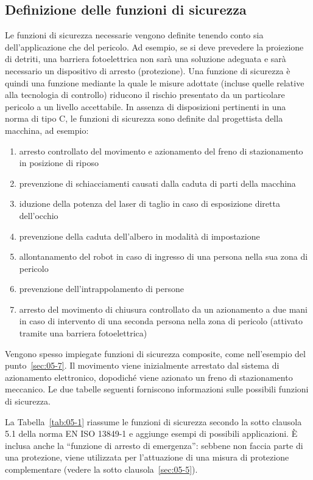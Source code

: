\subsection{Definizione delle funzioni di sicurezza}
\label{subsec:05-3-1}
Le funzioni di sicurezza necessarie vengono definite tenendo conto sia dell'applicazione che del pericolo. Ad esempio, se si deve prevedere la proiezione di detriti, una barriera fotoelettrica non sarà una soluzione adeguata e sarà necessario un dispositivo di arresto (protezione). Una funzione di sicurezza è quindi una funzione mediante la quale le misure adottate (incluse quelle relative alla tecnologia di controllo) riducono il rischio presentato da un particolare pericolo a un livello accettabile. In assenza di disposizioni pertinenti in una norma di tipo C, le funzioni di sicurezza sono definite dal progettista della macchina, ad esempio:
\begin{enumerate} [label=\alph*)]
    \item arresto controllato del movimento e azionamento del freno di stazionamento in posizione di riposo
    \item prevenzione di schiacciamenti causati dalla caduta di parti della macchina
    \item iduzione della potenza del laser di taglio in caso di esposizione diretta dell'occhio
    \item prevenzione della caduta dell'albero in modalità di impostazione
    \item allontanamento del robot in caso di ingresso di una persona nella sua zona di pericolo
    \item prevenzione dell'intrappolamento di persone
    \item arresto del movimento di chiusura controllato da un azionamento a due mani in caso di intervento di una seconda persona nella zona di pericolo (attivato tramite una barriera fotoelettrica)
\end{enumerate}
Vengono spesso impiegate funzioni di sicurezza composite, come nell'esempio del punto~\ref{sec:05-7}. Il movimento viene inizialmente arrestato dal sistema di azionamento elettronico, dopodiché viene azionato un freno di stazionamento meccanico. Le due tabelle seguenti forniscono informazioni sulle possibili funzioni di sicurezza.

La Tabella~\ref{tab:05-1} riassume le funzioni di sicurezza secondo la sotto clausola 5.1 della norma EN ISO 13849-1 e aggiunge esempi di possibili applicazioni. È inclusa anche la “funzione di arresto di emergenza”: sebbene non faccia parte di una protezione, viene utilizzata per l’attuazione di una misura di protezione complementare (vedere la sotto clausola~\ref{sec:05-5}).

